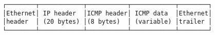 \documentclass[varwidth=50em,crop]{standalone}
\begin{document}
\begin{verbatim}
┌────────┬────────────┬───────────┬────────────┬────────┐
│Ethernet│ IP header  │ICMP header│ ICMP data  │Ethernet│
│header  │ (20 bytes) │(8 bytes)  │ (variable) │trailer │
└────────┴────────────┴───────────┴────────────┴────────┘
\end{verbatim}
\end{document}
